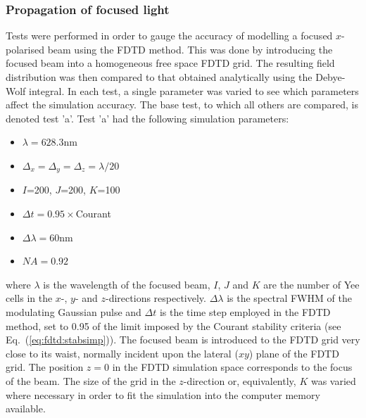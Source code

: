 \documentclass[a4paper, 12pt]{article}
\newcommand{\eq}[1]{Eq.\ (\ref{#1})}
\begin{document}
	\subsubsection{Propagation of focused light}
	\label{sec:fdtd:focuselight}
	Tests were performed in order to gauge the accuracy of modelling a
	focused $x$-polarised beam using the FDTD method. This was done by
	introducing the focused beam into a homogeneous free space FDTD grid. The
	resulting field distribution was then compared to that obtained
	analytically using the Debye-Wolf integral. In each test, a single parameter was
	varied to see which parameters affect the simulation accuracy. The
	base test, to which all others are compared, is denoted test 'a'. Test
	'a' had the following simulation parameters:
	\begin{itemize}
		\item $\lambda = 628.3$nm
		\item $\Delta_x=\Delta_y=\Delta_z=\lambda/20$
		\item $I$=200, $J$=200, $K$=100
		\item $\Delta t=0.95\times$Courant
		\item $\Delta\lambda=60$nm
		\item $NA=0.92$
	\end{itemize}
	where $\lambda$ is the wavelength of the focused beam, $I$, $J$ and
	$K$ are the number of Yee cells in the $x$-, $y$- and $z$-directions
	respectively. $\Delta\lambda$ is the spectral FWHM of the modulating
	Gaussian pulse and $\Delta t$ is the time step employed in the FDTD
	method, set to 0.95 of the limit imposed by the Courant stability
	criteria (see \eq{eq:fdtd:stabsimp}). The focused beam is introduced
	to the FDTD grid very close to its waist, normally incident upon the
	lateral ($xy$) plane of the FDTD grid. The position $z=0$ in the FDTD
	simulation space corresponds to the focus of the beam. The size of the
	grid in the $z$-direction or, equivalently, $K$ was varied where
	necessary in order to fit the simulation into the computer memory
	available.
\end{document}
